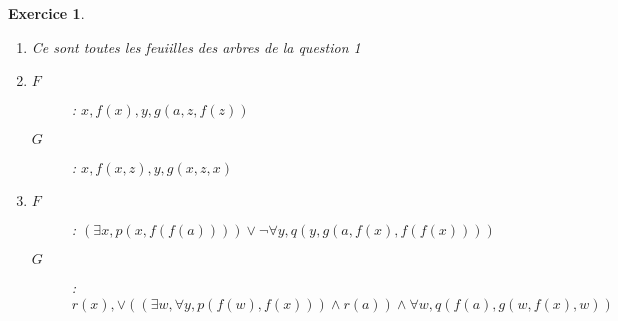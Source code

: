 \documentclass{article}
\theoremstyle{plain}
\newtheorem{exo}{Exercice}%
\begin{document}
\begin{exo}
\begin{enumerate}
    \item Ce sont toutes les feuiilles des arbres de la question 1
    \item \begin{description}
        \item[$F$]: $x, f(x), y, g(a, z, f(z))$
        \item[$G$]: $x, f(x, z), y, g(x, z, x)$ 
    \end{description}
    \item  \begin{description}
        \item[$F$]: $(\exists x, p(x, f(f(a)))) \vee \neg \forall y, q(y, g(a, f(x), f(f(x))))$
        \item[$G$]: $r(x), \vee ((\exists w, \forall y, p(f(w), f(x))) \wedge r(a)) 
            \wedge \forall w, q(f(a), g(w, f(x), w))$ 
    \end{description}
\end{enumerate}
\end{exo}
\end{document}
